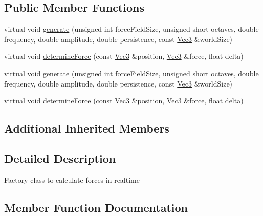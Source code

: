 \subsection*{Public Member Functions}
\begin{DoxyCompactItemize}
\item 
virtual void \hyperlink{classPURealTimeForceFieldCalculationFactory_ac698047a4841663680ed761857e9ae20}{generate} (unsigned int force\+Field\+Size, unsigned short octaves, double frequency, double amplitude, double persistence, const \hyperlink{classVec3}{Vec3} \&world\+Size)
\item 
virtual void \hyperlink{classPURealTimeForceFieldCalculationFactory_a8469774f9e5bdb65321f0955fb016670}{determine\+Force} (const \hyperlink{classVec3}{Vec3} \&position, \hyperlink{classVec3}{Vec3} \&force, float delta)
\item 
virtual void \hyperlink{classPURealTimeForceFieldCalculationFactory_a009d7bb7e28b4995a1600b3b1ac3895e}{generate} (unsigned int force\+Field\+Size, unsigned short octaves, double frequency, double amplitude, double persistence, const \hyperlink{classVec3}{Vec3} \&world\+Size)
\item 
virtual void \hyperlink{classPURealTimeForceFieldCalculationFactory_a77c8efbd2a6dcd7e5a25ee6bd48d8f6e}{determine\+Force} (const \hyperlink{classVec3}{Vec3} \&position, \hyperlink{classVec3}{Vec3} \&force, float delta)
\end{DoxyCompactItemize}
\subsection*{Additional Inherited Members}


\subsection{Detailed Description}
Factory class to calculate forces in realtime 

\subsection{Member Function Documentation}
\mbox{\label{classPURealTimeForceFieldCalculationFactory_a8469774f9e5bdb65321f0955fb016670}} 
